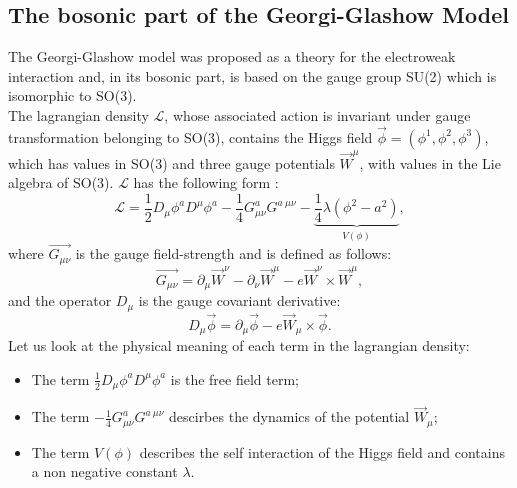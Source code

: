 \subsection{The bosonic part of the Georgi-Glashow Model}
The Georgi-Glashow model was proposed as a theory for the electroweak interaction and, in its bosonic part, is based on the gauge group SU(2) which is isomorphic to SO(3).\\
The lagrangian density $\mathcal{L}$, whose associated action is invariant under gauge transformation belonging to SO(3), contains the Higgs field $\vec{\phi} = ( \phi^1, \phi^2 , \phi^3)$, which has values in SO(3) and three gauge potentials $\Vec{W}^\mu$, with values in the Lie algebra of SO(3). 
$\mathcal{L}$ has the following form : 
\begin{equation}
\mathcal{L}= \frac{1}{2}D_{\mu}\phi^a D^\mu \phi^a  -\frac{1}{4} G_{\mu \nu}^a G^{a \ \mu \nu} - \underbrace{\frac{1}{4}\lambda (\phi^2 -a^2)}_{V(\phi)},
\label{eq:lag}
\end{equation}
where $\Vec{G_{\mu \nu}}$ is the gauge field-strength and is defined as follows:
\begin{equation}
\Vec{G_{\mu \nu}} = \partial_{\mu}  \Vec{W}^\nu -\partial_{\nu}  \Vec{W}^\mu - e \Vec{W}^\nu \times \Vec{W}^\mu,
\end{equation}
and the operator $D_{\mu}$ is the gauge covariant derivative: 
\begin{equation}
D_\mu \Vec{\phi} = \partial_\mu \Vec{\phi} - e \Vec{W}_\mu \times \Vec{\phi}.
\end{equation}
Let us look at the physical meaning of each term in the lagrangian density:
\begin{itemize}
    \item The term $\frac{1}{2}D_{\mu}\phi^a D^\mu \phi^a $ is the free field term;
    \item The term  $-\frac{1}{4} G_{\mu \nu}^a G^{a \ \mu \nu}$ descirbes the dynamics of the potential $\Vec{W}_{\mu}$;
    \item The term  $V(\phi) $ describes the self interaction of the Higgs field and contains a non negative constant $\lambda$.
\end{itemize}

